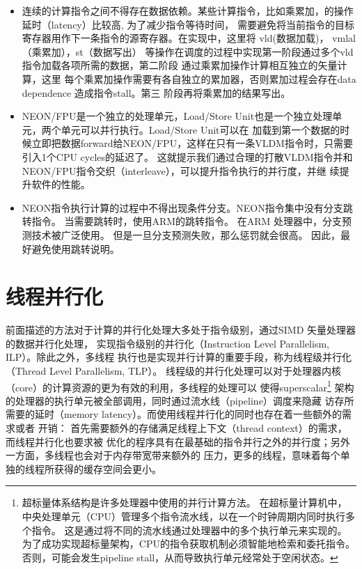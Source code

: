 \begin{itemize}
    \item 连续的计算指令之间不得存在数据依赖。某些计算指令，比如乘累加，的操作延时（latency）比较高, 为了减少指令等待时间，
    需要避免将当前指令的目标寄存器用作下一条指令的源寄存器。在实现中，这里将 vld(数据加载)， vmlal（乘累加），st（数据写出）
    等操作在调度的过程中实现第一阶段通过多个vld 指令加载各项所需的数据，第二阶段 通过乘累加操作计算相互独立的矢量计算，这里
    每个乘累加操作需要有各自独立的累加器，否则累加过程会存在data dependence 造成指令stall。第三 阶段再将乘累加的结果写出。
    \item NEON/FPU是一个独立的处理单元，Load/Store Unit也是一个独立处理单元，两个单元可以并行执行。Load/Store Unit可以在
    加载到第一个数据的时候立即把数据forward给NEON/FPU，这样在只有一条VLDM指令时，只需要引入1个CPU cycles的延迟了。
    这就提示我们通过合理的打散VLDM指令并和NEON/FPU指令交织（interleave），可以提升指令执行的并行度，并继 续提升软件的性能。
    \item NEON指令执行计算的过程中不得出现条件分支。NEON指令集中没有分支跳转指令。 当需要跳转时，使用ARM的跳转指令。 在ARM
    处理器中，分支预测技术被广泛使用。 但是一旦分支预测失败，那么惩罚就会很高。 因此，最好避免使用跳转说明。
\end{itemize}

\section{线程并行化}
前面描述的方法对于计算的并行化处理大多处于指令级别，通过SIMD 矢量处理器的数据并行化处理，
实现指令级别的并行化（Instruction Level Parallelism, ILP）。除此之外，多线程
执行也是实现并行计算的重要手段，称为线程级并行化（Thread Level Parallelism, TLP）。
线程级的并行化处理可以对于处理器内核（core）的计算资源的更为有效的利用，多线程的处理可以
使得superscalar\footnote{超标量体系结构是许多处理器中使用的并行计算方法。 在超标量计算机中，中央处理单元（CPU）管理多个指令流水线，以在一个时钟周期内同时执行多个指令。 这是通过将不同的流水线通过处理器中的多个执行单元来实现的。 为了成功实现超标量架构，CPU的指令获取机制必须智能地检索和委托指令。 否则，可能会发生pipeline stall，从而导致执行单元经常处于空闲状态。
} 架构的处理器的执行单元被全部调用，同时通过流水线（pipeline）调度来隐藏
访存所需要的延时（memory latency）。而使用线程并行化的同时也存在着一些额外的需求或者
开销： 首先需要额外的存储满足线程上下文（thread context）的需求，而线程并行化也要求被
优化的程序具有在最基础的指令并行之外的并行度；另外一方面，多线程也会对于内存带宽带来额外的
压力，更多的线程，意味着每个单独的线程所获得的缓存空间会更小。

